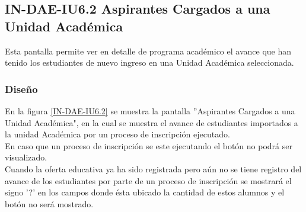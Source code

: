 \subsection{IN-DAE-IU6.2 Aspirantes Cargados a una Unidad Académica}

Esta pantalla permite ver en detalle de programa académico el avance que han tenido los estudiantes de nuevo ingreso en una Unidad Académica seleccionada.

\subsubsection{Diseño}

En la figura \ref{IN-DAE-IU6.2} se muestra la pantalla ''Aspirantes Cargados a una Unidad Académica", en la cual se muestra el avance de estudiantes importados a la unidad Académica por un proceso de inscripción ejecutado. \\

En caso que un proceso de inscripción se este ejecutando el botón  no podrá ser visualizado. \\

Cuando la oferta educativa ya ha sido registrada pero aún no se tiene registro del avance de los estudiantes por parte de un proceso de inscripción se mostrará el signo '?' en los campos donde ésta ubicado la cantidad de estos alumnos y el botón \IUVer{} no será mostrado.

 